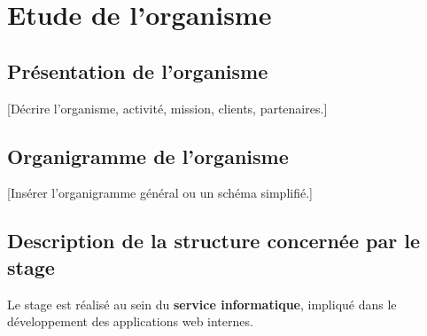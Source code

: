\chapter{Etude de l'organisme}

\section{Présentation de l'organisme}
[Décrire l'organisme, activité, mission, clients, partenaires.]

\section{Organigramme de l'organisme}
[Insérer l'organigramme général ou un schéma simplifié.]

\section{Description de la structure concernée par le stage}
Le stage est réalisé au sein du \textbf{service informatique}, impliqué dans le développement des applications web internes.
